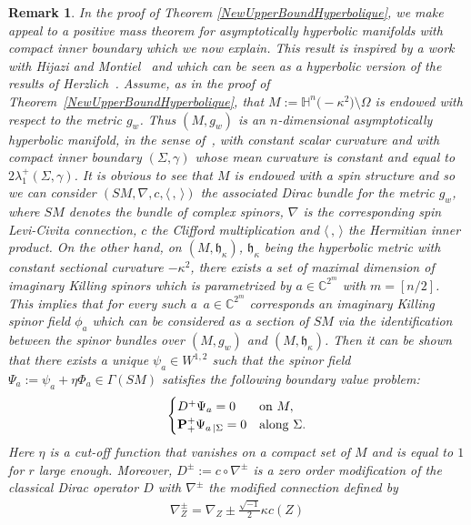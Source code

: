 \documentclass[pdftex]{sigma}
\numberwithin{equation}{section}
\newtheorem{Remark}[Theorem]{Remark}
\def\Paps{{\bf P}_+}
\begin{document}
\begin{Remark}\label{PMT-HyperbolicBoundary}
In the proof of Theorem \ref{NewUpperBoundHyperbolique}, we make appeal to a positive mass theorem for asymptotically hyperbolic manifolds with compact inner boundary which we now explain. This result is inspired by a work with Hijazi and Montiel~\cite{HijaziMontielRaulot4} and which can be seen as a hyperbolic version of the results of Herzlich~\cite{Herzlich1,Herzlich2}. Assume, as in the proof of Theorem~\ref{NewUpperBoundHyperbolique}, that $M:=\mathbb{H}^n\bigl(-\kappa^2\bigr)\setminus\Omega$ is endowed with respect to the metric $g_w$. Thus $(M,g_w)$ is an $n$-dimensional asymptotically hyperbolic manifold, in the sense of~\cite{AnderssonDahl1}, with constant scalar curvature and with compact inner boundary $(\Sigma,\gamma)$ whose mean curvature is constant and equal to $2\lambda^+_1(\Sigma,\gamma)$. It is obvious to see that $M$ is endowed with a spin structure and so we can consider $(SM,\nabla,c,\langle \,,\,\rangle )$ the associated Dirac bundle for the metric $g_w$, where $SM$ denotes the bundle of complex spinors, $\nabla$ is the corresponding spin Levi-Civita connection, $c$ the Clifford multiplication and $\langle \,,\,\rangle $ the Hermitian inner product.
On the other hand, on $(M,\mathfrak{h}_\kappa)$, $\mathfrak{h}_\kappa$ being the hyperbolic metric with constant sectional curvature $-\kappa^2$, there exists a set of maximal dimension of imaginary Killing spinors which is parametrized by $a\in\mathbb{C}^{2^m}$ with $m=[n/2]$. This implies that for every such a~$a\in\mathbb{C}^{2^m}$ corresponds an imaginary Killing spinor field $\phi_a$ which can be considered as a section of $SM$ via the identification between the spinor bundles over $(M,g_w)$ and $(M,\mathfrak{h}_\kappa)$. Then it can be shown that there exists a unique $\psi_a\in W^{1,2}$ such that the spinor field $\Psi_a:=\psi_a+\eta\Phi_a\in\Gamma(SM)$ satisfies the following boundary value problem:
\[
\begin{cases}
D^+\Psi_a=0 & {\rm on} \ M,\nonumber\\
\Paps^+\Psi_{a\,|\Sigma}=0 & {\rm along} \ \Sigma\nonumber.
\end{cases}
\]
Here $\eta$ is a cut-off function that vanishes on a compact set of $M$ and is equal to $1$ for $r$ large enough. Moreover, $D^\pm:=c\circ\nabla^\pm$ is a zero order modification of the classical Dirac operator $D$ with $\nabla^\pm$ the modified connection defined by
\begin{gather*}
\nabla^\pm_Z=\nabla_Z\pm\frac{\sqrt{-1}}{2}\kappa c(Z)

\end{gather*}
\end{Remark}
\end{document}

